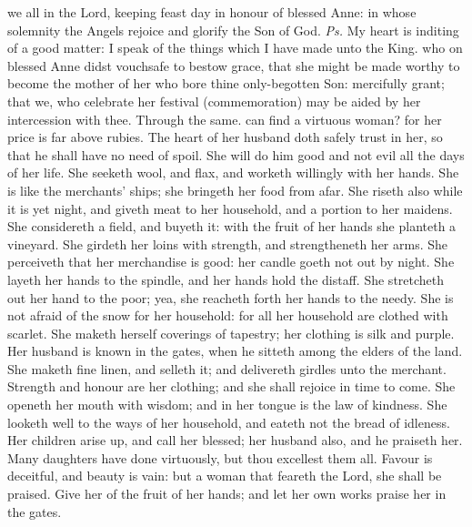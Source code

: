 
\introit
{} we all in the Lord, keeping feast day in honour of blessed Anne: in whose solemnity the Angels rejoice and glorify the Son of God. \textit{Ps.} My heart is inditing of a good matter: I speak of the things which I have made unto the King.
\collect
{} who on blessed Anne didst vouchsafe to bestow grace, that she might be made worthy to become the mother of her who bore thine only-begotten Son: mercifully grant; that we, who celebrate her festival (commemoration) may be aided by her intercession with thee. Through the same.
 can find a virtuous woman? for her price is far above rubies. The heart of her husband doth safely trust in her, so that he shall have no need of spoil. She will do him good and not evil all the days of her life. She seeketh wool, and flax, and worketh willingly with her hands. She is like the merchants’ ships; she bringeth her food from afar. She riseth also while it is yet night, and giveth meat to her household, and a portion to her maidens. She considereth a field, and buyeth it: with the fruit of her hands she planteth a vineyard. She girdeth her loins with strength, and strengtheneth her arms. She perceiveth that her merchandise is good: her candle goeth not out by night. She layeth her hands to the spindle, and her hands hold the distaff. She stretcheth out her hand to the poor; yea, she reacheth forth her hands to the needy. She is not afraid of the snow for her household: for all her household are clothed with scarlet. She maketh herself coverings of tapestry; her clothing is silk and purple. Her husband is known in the gates, when he sitteth among the elders of the land. She maketh fine linen, and selleth it; and delivereth girdles unto the merchant. Strength and honour are her clothing; and she shall rejoice in time to come. She openeth her mouth with wisdom; and in her tongue is the law of kindness. She looketh well to the ways of her household, and eateth not the bread of idleness. Her children arise up, and call her blessed; her husband also, and he praiseth her. Many daughters have done virtuously, but thou excellest them all. Favour is deceitful, and beauty is vain: but a woman that feareth the Lord, she shall be praised. Give her of the fruit of her hands; and let her own works praise her in the gates.
